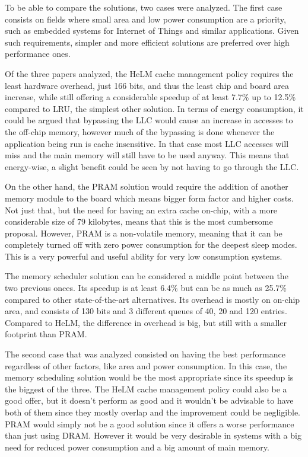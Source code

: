\documentclass[journal]{IEEEtran}
\begin{document}
To be able to compare the solutions, two cases were analyzed. The first case consists on fields where small area and low power consumption are a priority, such as embedded systems for Internet of Things and similar applications. Given such requirements, simpler and more efficient solutions are preferred over high performance ones.

Of the three papers analyzed, the HeLM cache management policy requires the least hardware overhead, just 166 bits, and thus the least chip and board area increase, while still offering a considerable speedup of at least 7.7\% up to 12.5\% compared to LRU, the simplest other solution. In terms of energy consumption, it could be argued that bypassing the LLC would cause an increase in accesses to the off-chip memory, however much of the bypassing is done whenever the application being run is cache insensitive. In that case most LLC accesses will miss and the main memory will still have to be used anyway. This means that energy-wise, a slight benefit could be seen by not having to go through the LLC.

On the other hand, the PRAM solution would require the addition of another memory module to the board which means bigger form factor and higher costs. Not just that, but the need for having an extra cache on-chip, with a more considerable size of 79 kilobytes, means that this is the most cumbersome proposal. However, PRAM is a non-volatile memory, meaning that it can be completely turned off with zero power consumption for the deepest sleep modes. This is a very powerful and useful ability for very low consumption systems.

The memory scheduler solution can be considered a middle point between the two previous onces. Its speedup is at least 6.4\% but can be as much as 25.7\% compared to other state-of-the-art alternatives. Its overhead is mostly on on-chip area, and consists of 130 bits and 3 different queues of 40, 20 and 120 entries. Compared to HeLM, the difference in overhead is big, but still with a smaller footprint than PRAM.

The second case that was analyzed consisted on having the best performance regardless of other factors, like area and power consumption. In this case, the memory scheduling solution would be the most appropriate since its speedup is the biggest of the three. The HeLM cache management policy could also be a good offer, but it doesn't perform as good and it wouldn't be advisable to have both of them since they mostly overlap and the improvement could be negligible. PRAM would simply not be a good solution since it offers a worse performance than just using DRAM. However it would be very desirable in systems with a big need for reduced power consumption and a big amount of main memory.
\end{document}
